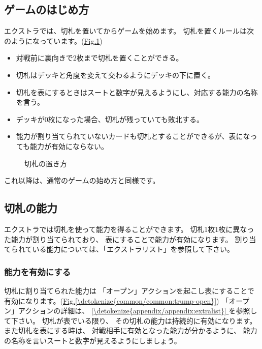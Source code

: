 \documentclass[letterpaper,10pt,dvipdfmx]{sphinxmanual}
\begin{document}
\subsection{ゲームのはじめ方}
\label{\detokenize{common/common:extra-start}}\label{\detokenize{common/common:id37}}
\sphinxAtStartPar
エクストラでは、切札を置いてからゲームを始めます。
切札を置くルールは次のようになっています。(\hyperref[\detokenize{common/common:trump}]{Fig.\@ \ref{\detokenize{common/common:trump}}})
\begin{itemize}
\item {} 
\sphinxAtStartPar
対戦前に裏向きで2枚まで切札を置くことができる。

\item {} 
\sphinxAtStartPar
切札はデッキと角度を変えて交わるようにデッキの下に置く。

\item {} 
\sphinxAtStartPar
切札を表にするときはスートと数字が見えるようにし、対応する能力の名称を言う。

\item {} 
\sphinxAtStartPar
デッキが0枚になった場合、切札が残っていても敗北する。

\item {} 
\sphinxAtStartPar
能力が割り当てられていないカードも切札とすることができるが、表になっても能力が有効にならない。

\end{itemize}

\begin{figure}[htbp]
\centering
\capstart

\noindent{}
\caption{切札の置き方}\label{\detokenize{common/common:id58}}\label{\detokenize{common/common:trump}}\end{figure}

\sphinxAtStartPar
これ以降は、通常のゲームの始め方と同様です。


\subsection{切札の能力}
\label{\detokenize{common/common:id38}}
\sphinxAtStartPar
エクストラでは切札を使って能力を得ることができます。
切札1枚1枚に異なった能力が割り当てられており、
表にすることで能力が有効になります。
割り当てられている能力については、「エクストラリスト」を参照して下さい。


\subsubsection{能力を有効にする}
\label{\detokenize{common/common:id39}}
\sphinxAtStartPar
切札に割り当てられた能力は
「オープン」アクションを起こし表にすることで有効になります。(\hyperref[\detokenize{common/common:trump-open}]{Fig.\@ \ref{\detokenize{common/common:trump-open}}})
「オープン」アクションの詳細は、 \hyperref[\detokenize{appendix/appendix:extralist}]{\ref{\detokenize{appendix/appendix:extralist}} } を参照して下さい。
切札が表でいる限り、
その切札の能力は持続的に有効になります。
また切札を表にする時は、
対戦相手に有効となった能力が分かるように、
能力の名称を言いスートと数字が見えるようにしましょう。
\end{document}
